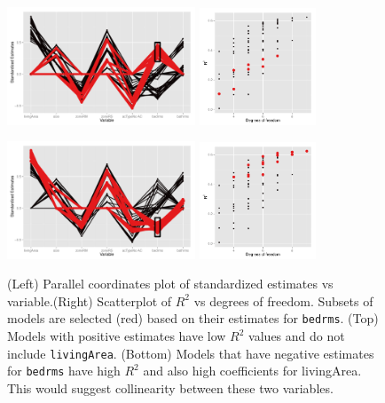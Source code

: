 \documentclass[preprint]{imsart}
\begin{document}
\begin{figure}[htbp]
	\centering
  \includegraphics[width=0.5\textwidth]{houses-brushing1}
  \includegraphics[width=0.31\textwidth]{houses-brushing2}

  \includegraphics[width=0.5\textwidth]{houses-brushing3}
  \includegraphics[width=0.31\textwidth]{houses-brushing4}

	\caption{(Left) Parallel coordinates plot of standardized estimates vs variable.(Right) Scatterplot of $R^2$ vs degrees of freedom. Subsets of models are selected (red) based on their estimates for {\tt bedrms}. (Top) Models with positive estimates have low $R^2$ values and do not include {\tt livingArea}. (Bottom) Models that have negative estimates for {\tt bedrms} have high $R^2$ and also high coefficients for livingArea. This would suggest  collinearity between these two variables.}
	\label{fig:coef-upag}
\end{figure}
\end{document}
